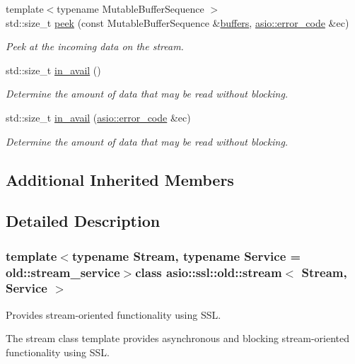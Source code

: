 \begin{DoxyCompactItemize}
{\footnotesize template$<$typename Mutable\+Buffer\+Sequence $>$ }\\std\+::size\+\_\+t \hyperlink{classasio_1_1ssl_1_1old_1_1stream_a60f1136af69b6f6d4c4eb5ae9824343b}{peek} (const Mutable\+Buffer\+Sequence \&\hyperlink{group__async__read_ga54dede45c3175148a77fe6635222c47d}{buffers}, \hyperlink{classasio_1_1error__code}{asio\+::error\+\_\+code} \&ec)
\begin{DoxyCompactList}\small\item\em Peek at the incoming data on the stream. \end{DoxyCompactList}\item 
std\+::size\+\_\+t \hyperlink{classasio_1_1ssl_1_1old_1_1stream_a0a7146a346f17d1411adca213934632a}{in\+\_\+avail} ()
\begin{DoxyCompactList}\small\item\em Determine the amount of data that may be read without blocking. \end{DoxyCompactList}\item 
std\+::size\+\_\+t \hyperlink{classasio_1_1ssl_1_1old_1_1stream_ae1de782526b419d58092c1a5d69bb0e5}{in\+\_\+avail} (\hyperlink{classasio_1_1error__code}{asio\+::error\+\_\+code} \&ec)
\begin{DoxyCompactList}\small\item\em Determine the amount of data that may be read without blocking. \end{DoxyCompactList}\end{DoxyCompactItemize}
\subsection*{Additional Inherited Members}


\subsection{Detailed Description}
\subsubsection*{template$<$typename Stream, typename Service = old\+::stream\+\_\+service$>$class asio\+::ssl\+::old\+::stream$<$ Stream, Service $>$}

Provides stream-\/oriented functionality using S\+S\+L. 

The stream class template provides asynchronous and blocking stream-\/oriented functionality using S\+S\+L.


